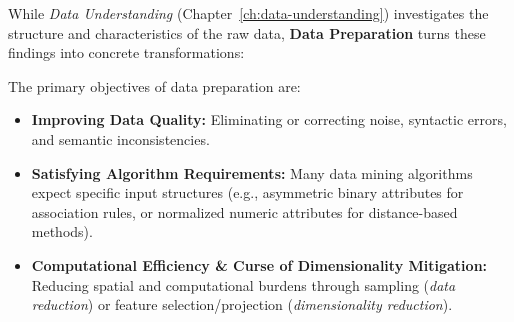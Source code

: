 While \textit{Data Understanding} (Chapter~\ref{ch:data-understanding}) investigates the structure and characteristics of the raw data, \textbf{Data Preparation} turns these findings into concrete transformations:
\begin{center}
\end{center}

The primary objectives of data preparation are:
\begin{itemize}
    \item \textbf{Improving Data Quality:} Eliminating or correcting noise, syntactic errors, and semantic inconsistencies.
    \item \textbf{Satisfying Algorithm Requirements:} Many data mining algorithms expect specific input structures (e.g., asymmetric binary attributes for association rules, or normalized numeric attributes for distance-based methods).
    \item \textbf{Computational Efficiency \& Curse of Dimensionality Mitigation:} Reducing spatial and computational burdens through sampling (\textit{data reduction}) or feature selection/projection (\textit{dimensionality reduction}).
\end{itemize}

